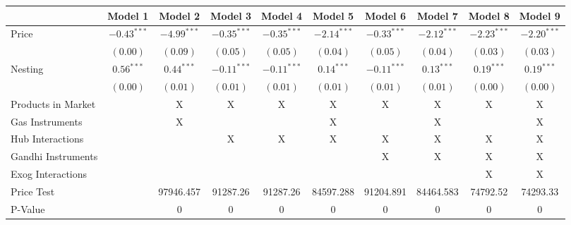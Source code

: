 
\begin{tabular}{l c c c c c c c c c}
\toprule
 & Model 1 & Model 2 & Model 3 & Model 4 & Model 5 & Model 6 & Model 7 & Model 8 & Model 9 \\
\midrule
Price                       & $-0.43^{***}$ & $-4.99^{***}$ & $-0.35^{***}$ & $-0.35^{***}$ & $-2.14^{***}$ & $-0.33^{***}$ & $-2.12^{***}$ & $-2.23^{***}$ & $-2.20^{***}$ \\
                            & $(0.00)$      & $(0.09)$      & $(0.05)$      & $(0.05)$      & $(0.04)$      & $(0.05)$      & $(0.04)$      & $(0.03)$      & $(0.03)$      \\
Nesting                     & $0.56^{***}$  & $0.44^{***}$  & $-0.11^{***}$ & $-0.11^{***}$ & $0.14^{***}$  & $-0.11^{***}$ & $0.13^{***}$  & $0.19^{***}$  & $0.19^{***}$  \\
                            & $(0.00)$      & $(0.01)$      & $(0.01)$      & $(0.01)$      & $(0.01)$      & $(0.01)$      & $(0.01)$      & $(0.00)$      & $(0.00)$      \\
\midrule
Products in Market          &               & X             & X             & X             & X             & X             & X             & X             & X             \\
Gas Instruments             &               & X             &               &               & X             &               & X             &               & X             \\
Hub Interactions            &               &               & X             & X             & X             & X             & X             & X             & X             \\
Gandhi Instruments          &               &               &               &               &               & X             & X             & X             & X             \\
Exog Interactions           &               &               &               &               &               &               &               & X             & X             \\
Price Test                  &               & 97946.457     & 91287.26      & 91287.26      & 84597.288     & 91204.891     & 84464.583     & 74792.52      & 74293.33      \\
P-Value                     &               & 0             & 0             & 0             & 0             & 0             & 0             & 0             & 0             \\

\end{tabular}
